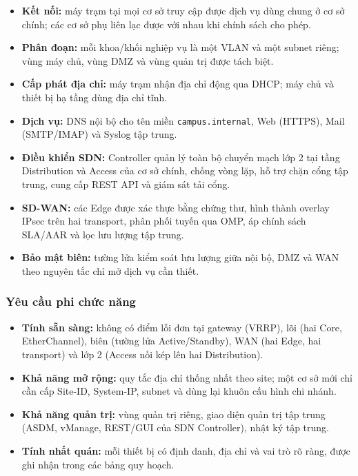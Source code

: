 \begin{itemize}
    \item \textbf{Kết nối:} máy trạm tại mọi cơ sở truy cập được dịch vụ dùng chung ở cơ sở chính; các cơ sở phụ liên lạc được với nhau khi chính sách cho phép.
    \item \textbf{Phân đoạn:} mỗi khoa/khối nghiệp vụ là một VLAN và một subnet riêng; vùng máy chủ, vùng DMZ và vùng quản trị được tách biệt.
    \item \textbf{Cấp phát địa chỉ:} máy trạm nhận địa chỉ động qua DHCP; máy chủ và thiết bị hạ tầng dùng địa chỉ tĩnh.
    \item \textbf{Dịch vụ:} DNS nội bộ cho tên miền \texttt{campus.internal}, Web (HTTPS), Mail (SMTP/IMAP) và Syslog tập trung.
    \item \textbf{Điều khiển SDN:} Controller quản lý toàn bộ chuyển mạch lớp 2 tại tầng Distribution và Access của cơ sở chính, chống vòng lặp, hỗ trợ chặn cổng tập trung, cung cấp REST API và giám sát tải cổng.
    \item \textbf{SD-WAN:} các Edge được xác thực bằng chứng thư, hình thành overlay IPsec trên hai transport, phân phối tuyến qua OMP, áp chính sách SLA/AAR và lọc lưu lượng tập trung.
    \item \textbf{Bảo mật biên:} tường lửa kiểm soát lưu lượng giữa nội bộ, DMZ và WAN theo nguyên tắc chỉ mở dịch vụ cần thiết.
\end{itemize}

\subsubsection{Yêu cầu phi chức năng}

\begin{itemize}
    \item \textbf{Tính sẵn sàng:} không có điểm lỗi đơn tại gateway (VRRP), lõi (hai Core, EtherChannel), biên (tường lửa Active/Standby), WAN (hai Edge, hai transport) và lớp 2 (Access nối kép lên hai Distribution).
    \item \textbf{Khả năng mở rộng:} quy tắc địa chỉ thống nhất theo site; một cơ sở mới chỉ cần cấp Site-ID, System-IP, subnet và dùng lại khuôn cấu hình chi nhánh.
    \item \textbf{Khả năng quản trị:} vùng quản trị riêng, giao diện quản trị tập trung (ASDM, vManage, REST/GUI của SDN Controller), nhật ký tập trung.
    \item \textbf{Tính nhất quán:} mỗi thiết bị có định danh, địa chỉ và vai trò rõ ràng, được ghi nhận trong các bảng quy hoạch.
\end{itemize}

